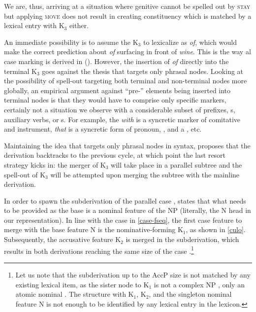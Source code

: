 \noindent We are, thus, arriving at a situation where genitive cannot be spelled out by \textsc{stay} but applying \textsc{move} does not result in creating constituency which is matched by a lexical entry with K$_{3}$ either. 
\par
An immediate possibility is to assume the  K$_{3}$ to lexicalize as \textit{of}, which would make the correct prediction about \textit{of} surfacing in front of \textit{wine}. This is the way al case marking is derived in \citeauthor{Caha2009} (\citeyear{Caha2009,Caha2011}). However, the insertion of \textit{of} directly into the terminal K$_{3}$ goes against the thesis that  targets only phrasal nodes. Looking at the possibility of spell-out targeting both terminal and non-terminal nodes more globally, an empirical argument against ``pre-'' elements being inserted into terminal nodes is that they would have to comprise only specific markers, certainly not a situation we observe with a considerable subset of prefixes, s, auxiliary verbs, or s. For example, the  \textit{with} is a syncretic marker of comitative and instrument, \textit{that} is a syncretic form of  pronoun, , and a , etc.
\par
Maintaining the idea that  targets only phrasal nodes in syntax, \cite{Starke2018} proposes that the derivation backtracks to the previous cycle, at which point the last resort strategy kicks in: the merger of K$_{3}$ will take place in a parallel subtree and the spell-out of K$_{3}$ will be attempted upon merging the subtree with the mainline derivation. 
\par
In order to spawn the subderivation of the parallel case , \cite{Starke2018} states that what needs to be provided as the base is a nominal feature of the NP (literally, the N head in our representation). In line with the case  in \ref{case-fseq}, the first case feature to merge with the base feature N is the nominative-forming K$_{1}$, as shown in \ref{culo}. Subsequently, the accusative feature K$_{2}$ is merged in the subderivation, which results in both derivations reaching the same size of the case .\footnote{Let us note that the subderivation up to the AccP size is not matched by any existing lexical item, as the sister node to K$_{1}$ is not a complex NP , only an atomic nominal .  The structure with K$_{1}$, K$_{2}$, and the singleton nominal feature N is not enough to be identified by any lexical entry in the  lexicon.
}%

